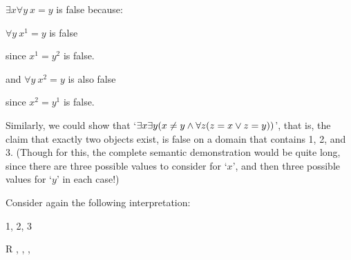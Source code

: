 \begin{ebullet}
\item $\exists x \forall y \ x = y$ is false because:
\begin{etriangle}
\item $\forall y \ x^1 = y$ is false
\begin{etriangle}
\item since $x^1 = y^2$ is false.
\end{etriangle}
\item and $\forall y \ x^2 = y$ is also false
\begin{etriangle}
\item since $x^2 = y^1$ is false.
\end{etriangle}
\end{etriangle}
\end{ebullet}
Similarly, we could show that `$\exists x \exists y( x \neq y \wedge \forall z(z = x \vee z = y))$', that is, the claim that exactly two objects exist, is false on a domain that contains 1, 2, and 3. (Though for this, the complete semantic demonstration would be quite long, since there are three possible values to consider for `$x$', and then three possible values for `$y$' in each case!)


\practiceproblems

\problempart Consider again the following interpretation:

\begin{multicols}{2}
	\begin{ekey}
		\item[\text{Domain}] 1, 2, 3
		\item[R] , , ,  
	\end{ekey}
\columnbreak


\end{multicols}


